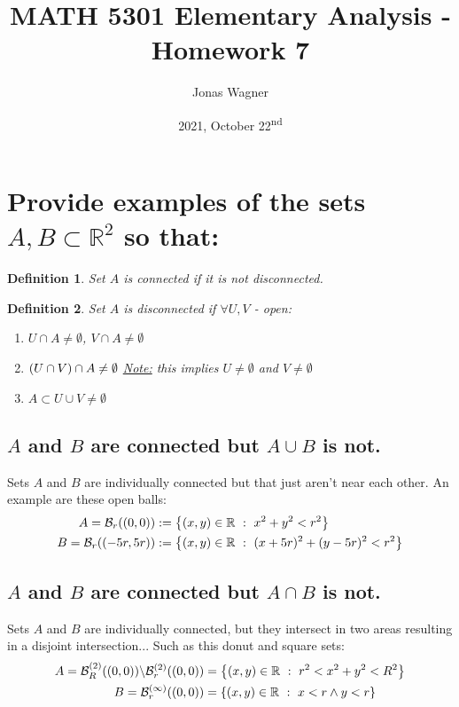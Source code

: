 \documentclass[]{article}
\title{MATH 5301 Elementary Analysis - Homework 7}
\author{Jonas Wagner}
\date{2021, October 22\textsuperscript{nd}}
\newcommand{\R}{\mathbb{R}}
\newcommand{\st}{\ : \ }
\newtheorem{definition}{Definition}
\begin{document}
\maketitle

\section{Provide examples of the sets $A,B \subset \R^2$ so that:}

\begin{definition}
    Set $A$ is \emph{connected} if it is not disconnected.
\end{definition}
\begin{definition}
    Set $A$ is \emph{disconnected} if $\forall U, V$ - open: 
    \begin{enumerate}
        \item $U \cap A \neq \emptyset$, $V \cap A \neq \emptyset$
        \item $\qty(U \cap V) \cap A \neq \emptyset$ \quad \underline{Note:} this implies $U \neq \emptyset$ and $V \neq \emptyset$
        \item $A \subset U \cup V \neq \emptyset$
    \end{enumerate}
\end{definition}

\subsection{$A$ and $B$ are connected but $A \cup B$ is not.}
Sets $A$ and $B$ are individually connected but that just aren't near each other. An example are these open balls:
\begin{align*}
    A = \mathcal{B}_{r}((0,0))
        &:= \qty{(x,y)\in\R \st x^2 + y^2 < r^2}\\
    B = \mathcal{B}_{r}((-5r,5r))
        &:= \qty{(x,y)\in\R \st (x+5r)^2 + (y-5r)^2 < r^2}
\end{align*}

\subsection{$A$ and $B$ are connected but $A \cap B$ is not.}
Sets $A$ and $B$ are individually connected, but they intersect in two areas resulting in a disjoint intersection... Such as this donut and square sets:
\begin{align*}
    A = \mathcal{B}^{(2)}_{R}((0,0)) \backslash \mathcal{B}^{(2)}_{r}((0,0))
        &= \qty{(x,y)\in\R \st r^2 < x^2 + y^2 < R^2}\\
    B = \mathcal{B}^{(\infty)}_{r}((0,0))
        &= \qty{(x,y) \in \R \st x < r \land y < r}
\end{align*}
\end{document}
